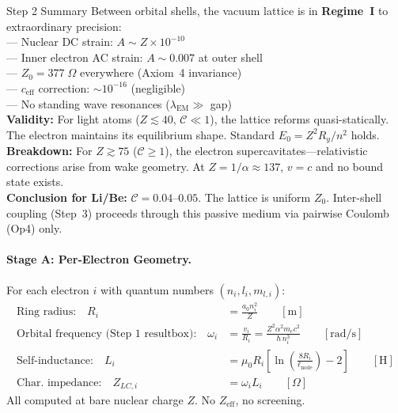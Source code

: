 \begin{resultbox}{Step 2 Summary}
Between orbital shells, the vacuum lattice is in
\textbf{Regime~I} to extraordinary precision:\\
--- Nuclear DC strain: $A \sim Z \times 10^{-10}$ \\
--- Inner electron AC strain: $A \sim 0.007$ at outer shell \\
--- $Z_0 = 377\;\Omega$ everywhere (Axiom~4 invariance) \\
--- $c_{\text{eff}}$ correction: $\sim 10^{-16}$ (negligible) \\
--- No standing wave resonances ($\lambda_{\text{EM}} \gg$ gap) \\[4pt]
\textbf{Validity:} For light atoms ($Z \lesssim 40$,
$\mathcal{C} \ll 1$), the lattice reforms quasi-statically.
The electron maintains its equilibrium shape.
Standard $E_0 = Z^2 R_y / n^2$ holds.\\[4pt]
\textbf{Breakdown:} For $Z \gtrsim 75$ ($\mathcal{C} \geq 1$),
the electron supercavitates---relativistic corrections
arise from wake geometry.  At $Z = 1/\alpha \approx 137$,
$v = c$ and no bound state exists.\\[4pt]
\textbf{Conclusion for Li/Be:} $\mathcal{C} = 0.04$--$0.05$.
The lattice is uniform $Z_0$.  Inter-shell coupling
(Step~3) proceeds through this passive medium
via pairwise Coulomb (Op4) only.
\end{resultbox}

\paragraph{Stage A: Per-Electron Geometry.}
For each electron $i$ with quantum numbers $(n_i, l_i, m_{l,i})$:
\begin{align}
    \text{Ring radius:} \quad
    R_i &= \frac{a_0 n_i^2}{Z} \qquad [\text{m}]
    \label{eq:ring_radius} \\
    \text{Orbital frequency (Step~1 resultbox):} \quad
    \omega_i &= \frac{v_i}{R_i}
    = \frac{Z^2 \alpha^2 m_e c^2}{\hbar\, n_i^3}
    \qquad [\text{rad/s}] \\
    \text{Self-inductance:} \quad
    L_i &= \mu_0 R_i \left[\ln\!\left(
    \frac{8 R_i}{\ell_{\text{node}}}\right) - 2\right]
    \qquad [\text{H}] \\
    \text{Char.\ impedance:} \quad
    Z_{LC,i} &= \omega_i L_i \qquad [\Omega]
\end{align}
All computed at bare nuclear charge $Z$.
No $Z_{\text{eff}}$, no screening.

